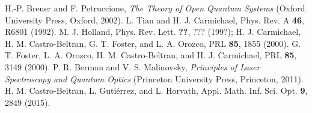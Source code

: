 \documentclass[twocolumn,aps,eqsecnum,showkeys,amsmath]{revtex4}
\begin{document}
\begin{references}
%
 H.-P. Breuer and F. Petruccione, \textit{The Theory of 
Open Quantum Systems} (Oxford University Press, Oxford, 2002). 
%
 L. Tian and H. J. Carmichael, Phys. Rev. A \textbf{46}, 
	R6801 (1992).
%
 M. J. Holland, Phys. Rev. Lett. \textbf{??}, ??? (199?); 
%
 H. J. Carmichael, H. M. Castro-Beltran, G. T. Foster, 
and L. A. Orozco, PRL \textbf{85}, 1855 (2000).
%
 G. T. Foster, L. A. Orozco, H. M. Castro-Beltran, and 
	H. J. Carmichael, PRL \textbf{85}, 3149 (2000).
%
%
 P. R. Berman and V. S. Malinovsky, \textit{Principles 
of Laser Spectroscopy and Quantum Optics} (Princeton University Press, 
Princeton, 2011).
%
 H. M. Castro-Beltran, L. Guti\'errez, and L. Horvath,  
Appl. Math. Inf. Sci. Opt. \textbf{9}, 2849 (2015). 
%

 

\end{references}
\end{document}
